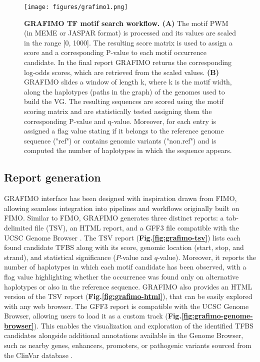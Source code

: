 \documentclass[a4paper, titlepage, openright]{book}
\newcommand{\grafimo}{GRAFIMO\xspace}
\begin{document}
\begin{figure}
	\centering
	\texttt{[image: figures/grafimo1.png]}
	\caption[\grafimo TF motif search workflow.]{\textbf{\grafimo TF motif search workflow. (A)} The motif PWM (in MEME or JASPAR format) is processed and its values are scaled in the range [0, 1000]. The resulting score matrix is used to assign a score and a corresponding P-value to each motif occurrence candidate. In the final report \grafimo returns the corresponding log-odds scores, which are retrieved from the scaled values. \textbf{(B)} \grafimo slides a window of length k, where k is the motif width, along the haplotypes (paths in the graph) of the genomes used to build the VG. The resulting sequences are scored using the motif scoring matrix and are statistically tested assigning them the corresponding P-value and q-value. Moreover, for each entry is assigned a flag value stating if it belongs to the reference genome sequence ("ref") or contains genomic variants ("non.ref") and is computed the number of haplotypes in which the sequence appears.}
	\label{fig:grafimo1}
\end{figure} 

\subsection{Report generation}
\grafimo interface has been designed with inspiration drawn from FIMO, allowing seamless integration into pipelines and workflows originally built on FIMO. Similar to FIMO, \grafimo generates three distinct reports: a tab-delimited file (TSV), an HTML report, and a GFF3 file compatible with the UCSC Genome Browser \citep{lee2020ucsc}. The TSV report (\textbf{Fig.\ref{fig:grafimo-tsv}}) lists each found candidate TFBS along with its score, genomic location (start, stop, and strand), and statistical significance ($P$-value and $q$-value). Moreover, it reports the number of haplotypes in which each motif candidate has been observed, with a flag value highlighting whether the occurrence was found only on alternative haplotypes or also in the reference sequence. \grafimo also provides an HTML version of the TSV report (\textbf{Fig.\ref{fig:grafimo-html}}), that can be easily explored with any web browser. The GFF3 report is compatible with the UCSC Genome Browser, allowing users to load it as a custom track (\textbf{Fig.\ref{fig:grafimo-genome-browser}}). This enables the visualization and exploration of the identified TFBS candidates alongside additional annotations available in the Genome Browser, such as nearby genes, enhancers, promoters, or pathogenic variants sourced from the ClinVar database \citep{landrum2020clinvar}.
\end{document}
